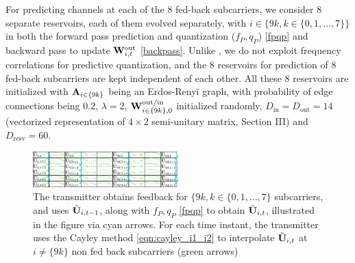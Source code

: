 \documentclass[conference]{IEEEtran}
\begin{document}
{For predicting channels at each of the $8$ fed-back subcarriers, we consider $8$ separate reservoirs, each of them evolved separately, with $i\in\{9k, k \in \{0,1,\ldots,7\}\}$ in both the forward pass prediction and quantization ($f_P,q_P$) \eqref{fpqp} and backward pass to update ${\bf W}_{i,t}^{\text{out}}$ \eqref{backpass}. Unlike \cite{Gupt1905:Predictive}, we do not exploit frequency correlations for predictive quantization, and the $8$ reservoirs for prediction of $8$ fed-back subcarriers are kept independent of each other.
All these 8 reservoirs are initialized with ${\bf A}_{i\in\{9k\}}$ being an Erdos-Reny\"i graph, with probability of edge connections being $0.2$, $\lambda=2$, ${\bf W}^{\text{out/in}}_{i\in\{9k\},0}$ initialized randomly, $D_{\text{in}}=D_{\text{out}}=14$ (vectorized representation of $4\times2$ semi-unitary matrix, Section III) and $D_{\text{resv}}=60$.
\begin{figure}
\centering
\includegraphics[width=0.5\textwidth]{images/table.pdf}
\caption{The transmitter obtains feedback for $\{9k, k \in \{0,1,\ldots,7\}$ subcarriers, and uses $\tilde{{\bf U}}_{i,t-1}$, along with $f_P,q_P$ \eqref{fpqp} to obtain $\tilde{{\bf U}}_{i,t}$, illustrated in the figure via cyan arrows. For each time instant, the transmitter uses the Cayley method  \eqref{eqn:cayley_i1_i2} to interpolate $\tilde{{\bf U}}_{i,t}$ at $i\neq\{9k\}$ non fed back subcarriers (green arrows)}
\label{table}
\end{figure}

}
\end{document}
